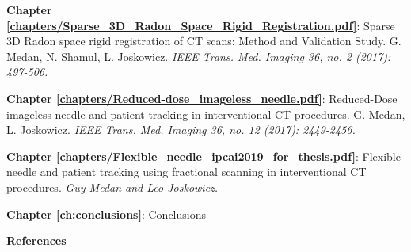 \textbf{Chapter \ref{chapters/Sparse_3D_Radon_Space_Rigid_Registration.pdf}}: Sparse 3D Radon space rigid registration of CT scans: Method and Validation Study.
G. Medan, N. Shamul, L. Joskowicz. \textit{IEEE Trans. Med. Imaging 36, no. 2 (2017): 497-506.}

\textbf{Chapter \ref{chapters/Reduced-dose_imageless_needle.pdf}}: Reduced-Dose imageless needle and patient tracking in interventional CT procedures.
G. Medan, L. Joskowicz. \textit{IEEE Trans. Med. Imaging 36, no. 12 (2017): 2449-2456.}

\textbf{Chapter \ref{chapters/Flexible_needle_ipcai2019_for_thesis.pdf}}: Flexible needle and patient tracking using fractional scanning in interventional CT procedures. \textit{Guy Medan and Leo Joskowicz.}

\textbf{Chapter \ref{ch:conclusions}}: Conclusions

\textbf{References}